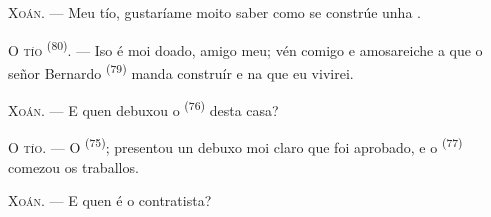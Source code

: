 %
%

\VUsaut{6.0mm}
\VUsaut{1.4mm}
\VUsaut{2.2mm}

\VUsaut{3.0mm}

\textsc{Xoán}. --- Meu tío, gustaríame moito saber como se constrúe unha
.

\textsc{O tío} \textsuperscript{(80)}. --- Iso é moi doado, amigo meu; vén comigo e
amosareiche a que o señor Bernardo \textsuperscript{(79)} manda construír e na que
eu vivirei.

\textsc{Xoán}. --- E quen debuxou o  \textsuperscript{(76)} desta
casa?

\textsc{O tío}. --- O  \textsuperscript{(75)}; presentou un
debuxo moi claro que foi aprobado, e o 
\textsuperscript{(77)} comezou os traballos.

\textsc{Xoán}. --- E quen é o contratista?

